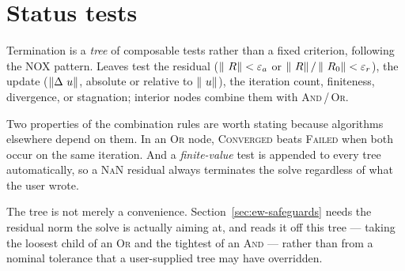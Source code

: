 \section{Status tests}
\label{sec:status}

Termination is a \emph{tree} of composable tests rather than a fixed criterion,
following the NOX pattern.  Leaves test the residual ($\left\lVert ~R \right\rVert <
\varepsilon_a$ or $\left\lVert ~R \right\rVert/\left\lVert ~R_0 \right\rVert < \varepsilon_r$), the update
($\left\lVert \Delta~u \right\rVert$, absolute or relative to $\left\lVert ~u \right\rVert$), the iteration
count, finiteness, divergence, or stagnation; interior nodes combine them with
\textsc{And}\,/\,\textsc{Or}.

Two properties of the combination rules are worth stating because algorithms
elsewhere depend on them.  In an \textsc{Or} node, \textsc{Converged} beats
\textsc{Failed} when both occur on the same iteration.  And a
\emph{finite-value} test is appended to every tree automatically, so a
\textsc{NaN} residual always terminates the solve regardless of what the user
wrote.

The tree is not merely a convenience.  Section~\ref{sec:ew-safeguards} needs
the residual norm the solve is actually aiming at, and reads it off this tree
--- taking the loosest child of an \textsc{Or} and the tightest of an
\textsc{And} --- rather than from a nominal tolerance that a user-supplied tree
may have overridden.
